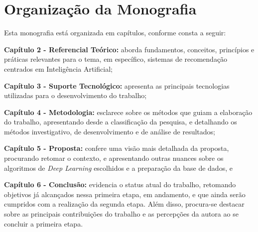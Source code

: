 \section{Organização da Monografia}\label{sec:organizacao}

Esta monografia está organizada em capítulos, conforme consta a seguir:

\textbf{Capítulo 2 - Referencial Teórico:} aborda fundamentos, conceitos, princípios e práticas
relevantes para o tema, em específico, sistemas de recomendação centrados em Inteligência Artificial;

\textbf{Capítulo 3 - Suporte Tecnológico:} apresenta as principais tecnologias utilizadas para
o desenvolvimento do trabalho;

\textbf{Capítulo 4 - Metodologia:} esclarece sobre os métodos que guiam a elaboração do trabalho, apresentando desde a classificação da 
pesquisa, e detalhando os métodos investigativo, de desenvolvimento e de análise de resultados;

\textbf{Capítulo 5 - Proposta:} confere uma visão mais detalhada da proposta, procurando retomar o contexto, e apresentando outras 
nuances sobre os algoritmos de \textit{Deep Learning} escolhidos e a preparação da base de dados, e

\textbf{Capítulo 6 - Conclusão:} evidencia o status atual do trabalho, retomando objetivos já alcançados nessa primeira 
etapa, em andamento, e que ainda serão cumpridos com a realização da segunda etapa. Além disso, procura-se destacar 
sobre as principais contribuições do trabalho e as percepções da autora ao se concluir a primeira etapa. 
